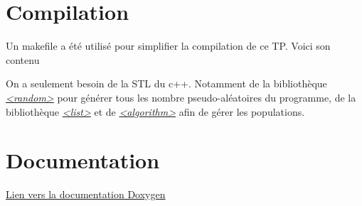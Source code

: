 \documentclass{article}
\newcommand{\changeurlcolor}[1]{\hypersetup{urlcolor=#1}}
\begin{document}
\section{Compilation}
Un makefile a été utilisé pour simplifier la compilation de ce TP. Voici son contenu


On a seulement besoin de la STL du c++. Notamment de la bibliothèque \href{https://en.cppreference.com/w/cpp/numeric/random}{\emph{<random>}}
pour générer tous les nombre pseudo-aléatoires du programme, de la bibliothèque \href{https://en.cppreference.com/w/cpp/container/list}{\emph{<list>}}
et de \href{https://en.cppreference.com/w/cpp/algorithm}{\emph{<algorithm>}} afin de gérer les populations.

\section{Documentation}
\changeurlcolor{blue}\href{run:Documentation.pdf}{Lien vers la documentation Doxygen}
\end{document}
